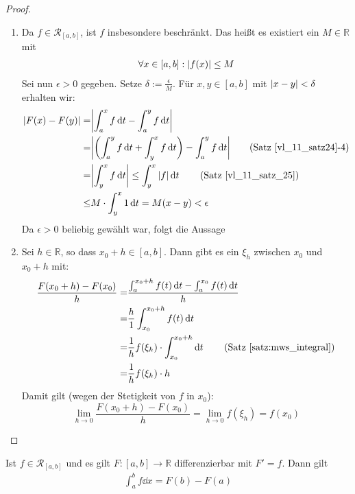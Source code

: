 \begin{proof}~
	\begin{enumerate}
		\item Da $f \in \mathcal{R}_{[a,b]}$, ist $f$ insbesondere beschränkt.
		Das heißt es existiert ein $M \in \mathbb{R}$ mit 
		\begin{align*}
			\forall x \in [a,b]:\abs{f(x)} \leq M
		\end{align*}
		Sei nun $\epsilon > 0$ gegeben. Setze $\delta := \frac{\epsilon}{M}$. 
		Für $x, y \in [a,b]$ mit $\abs{x-y} < \delta$ erhalten wir:
		\begin{align*}
			\abs{F(x) - F(y)} = & \abs{\int_a^x f \dd{t} - \int_a^y f \dd{t} }\\
			= &  \abs{ \left (\int_a^y f\dd{t} + \int_y^x f\dd{t} \right ) - \int_a^yf\dd{t}} \tag{Satz~\ref{vl_11_satz24}-4}\\
			= & \abs{\int_y^x f\dd{t}} \leq \int_y^x \abs{f} \dd{t} \tag{Satz~\ref{vl_11_satz_25}}\\
			\leq & M \cdot \int_y^x 1 \dd{t} = M (x-y) < \epsilon
		\end{align*}
		Da $\epsilon > 0$ beliebig gewählt war, folgt die Aussage
		\item Sei $h \in \mathbb{R}$, so dass $x_0 +h \in [a,b]$.
		Dann gibt es ein $\xi_h$ zwischen $x_0$ und $x_0+h$ mit:
		\begin{align*}
			\frac{F(x_0 + h) - F(x_0)}{h}
			= & \frac{ \int_a^{x_0+h}f(t)\dd{t}- \int_a^{x_0}f(t)\dd{t}}{h} \\
			= & \frac{h}{1} \int_{x_0}^{x_0+h} f(t)\dd{t} \\
			= & \frac{1}{h} f(\xi_h) \cdot \int_{x_0}^{x_0+h} \dd{t} \tag{Satz~\ref{satz:mws_integral}}\\
			= & \frac{1}{h} f(\xi_h) \cdot h
		\end{align*}
		 Damit gilt (wegen der Stetigkeit von $f$ in $x_0$): \\
			$$\lim\limits_{h \rightarrow 0}{\frac{F(x_0+h)-F(x_0)}{h}} 
			= \lim\limits_{h \rightarrow 0} f(\xi_h) = f(x_0)$$
	\end{enumerate}
\end{proof}


\begin{Satz}{\label{vl_12_satz_02}
	Ist $f \in \mathcal{R}_{[a,b]}$ und es gilt $F: [a,b] \rightarrow \mathbb{R}$
	differenzierbar mit $F' = f$. Dann gilt
	\begin{align*}
		\int_a^b f\dd{x} = F(b) - F(a) 
	\end{align*}
}\end{Satz}

